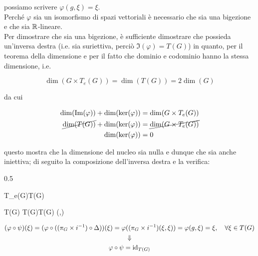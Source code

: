 {possiamo scrivere $ \varphi(g, \xi) = \xi $. \\
Perché $ \varphi $ sia un isomorfismo di spazi vettoriali è necessario che sia una bigezione e che sia $ \mathbb{R} $-lineare. \\
Per dimostrare che sia una bigezione, è sufficiente dimostrare che possieda un'inversa destra (i.e. sia suriettiva, perciò $ \Im(\varphi) = T(G) $) in quanto, per il teorema della dimensione e per il fatto che dominio e codominio hanno la stessa dimensione, i.e.

\begin{equation}
	\dim(G \times T_{e}(G)) = \dim(T(G)) = 2 \dim(G)
\end{equation}

da cui

\begin{align}
	\begin{split}
		\dim(\Im(\varphi)) + \dim(\ker(\varphi)) &= \dim(G \times T_{e}(G)) \\
		\cancel{ \dim(T(G)) } + \dim(\ker(\varphi)) &= \cancel{ \dim(G \times T_{e}(G)) } \\
		\dim(\ker(\varphi)) &= 0
	\end{split}
\end{align}

questo mostra che la dimensione del nucleo sia nulla e dunque che sia anche iniettiva; di seguito la composizione dell'inversa destra e la verifica:

	{0.5}{%
				{T_{e}(G)}{T(G)}
				{\xi}{\xi}
			
			\map{\Delta}
				{T(G) \times T(G)}{T(G)}
				{\xi}{(\xi,\xi)}
			}

\begin{gather}
	(\varphi \circ \psi)(\xi) = (\varphi \circ ((\pi_{G} \times i^{-1}) \circ \Delta))(\xi) %
	= \varphi ((\pi_{G} \times i^{-1})(\xi,\xi)) %
	= \varphi(g,\xi) %
	= \xi %
	\qcomma \forall \xi \in T(G) \nonumber \\
	\Downarrow \\
	\varphi \circ \psi = \id_{T(G)} \nonumber
\end{gather}

}
